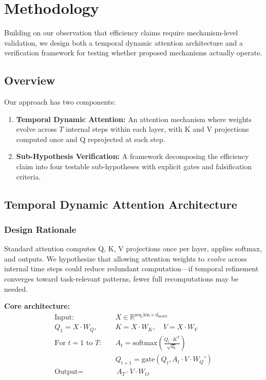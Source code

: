 \section{Methodology}
\label{sec:methodology}

Building on our observation that efficiency claims require mechanism-level validation, we design both a temporal dynamic attention architecture and a verification framework for testing whether proposed mechanisms actually operate.

\subsection{Overview}

Our approach has two components:

\begin{enumerate}
    \item \textbf{Temporal Dynamic Attention:} An attention mechanism where weights evolve across $T$ internal steps within each layer, with K and V projections computed once and Q reprojected at each step.

    \item \textbf{Sub-Hypothesis Verification:} A framework decomposing the efficiency claim into four testable sub-hypotheses with explicit gates and falsification criteria.
\end{enumerate}

\subsection{Temporal Dynamic Attention Architecture}

\subsubsection{Design Rationale}

Standard attention computes Q, K, V projections once per layer, applies softmax, and outputs. We hypothesize that allowing attention weights to \emph{evolve} across internal time steps could reduce redundant computation---if temporal refinement converges toward task-relevant patterns, fewer full recomputations may be needed.

\textbf{Core architecture:}
\begin{align}
\text{Input:} \quad & X \in \mathbb{R}^{\text{seq\_len} \times d_{\text{model}}} \nonumber \\
Q_1 = X \cdot W_Q, \quad & K = X \cdot W_K, \quad V = X \cdot W_V \nonumber \\
\text{For } t = 1 \text{ to } T: \quad & A_t = \text{softmax}\left(\frac{Q_t \cdot K^T}{\sqrt{d_k}}\right) \nonumber \\
& Q_{t+1} = \text{gate}(Q_t, A_t \cdot V \cdot W_Q') \nonumber \\
\text{Output} = & \, A_T \cdot V \cdot W_O \nonumber
\end{align}

